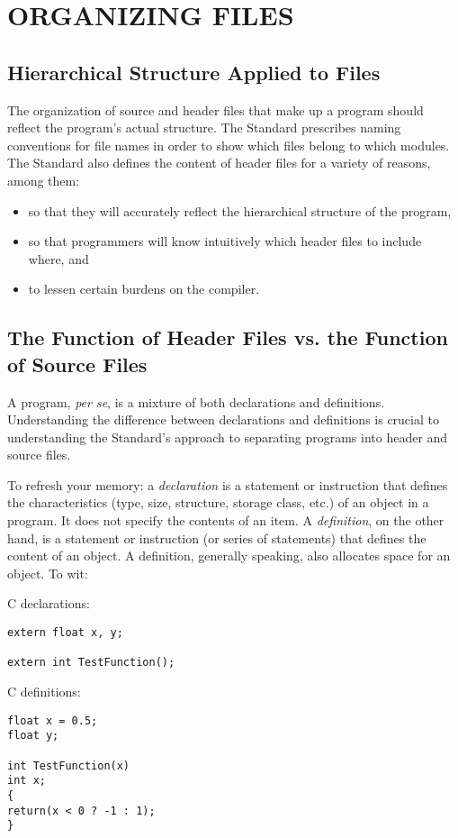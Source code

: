 \newpage
\section{ORGANIZING FILES}

\subsection{Hierarchical Structure Applied to Files}
The organization of source and header files that make up a program
should reflect the program's actual structure.  The Standard
prescribes naming conventions for file names in order to show which
files belong to which modules.  The Standard also defines the content
of header files for a variety of reasons, among them:
\begin{itemize}
\item so that they will accurately reflect the hierarchical structure of the program,
\item so that programmers will know intuitively which header files to include
where, and
\item to lessen certain burdens on the compiler.
\end{itemize}

\subsection{The Function of Header Files vs. the Function of Source Files}
A program, {\em per se}, is a mixture of both declarations and
definitions.  Understanding the difference between declarations and
definitions is crucial to understanding the Standard's approach to
separating programs into header and source files.

To refresh your memory: a {\em declaration} is a statement or
instruction that defines the characteristics (type, size, structure,
storage class, etc.) of an object in a program.  It does not specify
the contents of an item.  A {\em definition}, on the other hand, is a
statement or instruction (or series of statements) that defines the
content of an object.  A definition, generally speaking, also
allocates space for an object.  To wit:

C declarations:

\begin{verbatim}
extern float x, y;

extern int TestFunction();
\end{verbatim}

C definitions:
\begin{verbatim}
float x = 0.5;
float y;

int TestFunction(x)
int x;
{
return(x < 0 ? -1 : 1);
}
\end{verbatim}

